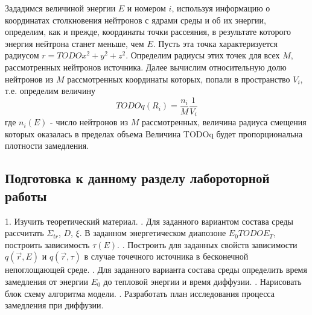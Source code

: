\documentclass[a4paper]{article}
\begin{document}
    Зададимся величиной энергии $E$ и номером $i$, используя
    информацию о координатах столкновения нейтронов с ядрами среды
    и об их энергии, определим, как и прежде, координаты точки
    рассеяния, в результате которого энергия нейтрона станет меньше,
    чем $E$. Пусть эта точка характеризуется радиусом
    \(r=TODO{x^2+y^2+z^2}\). Определим радиусы этих точек для всех
    $M$, рассмотренных нейтронов источника. Далее вычислим
    относительную долю нейтронов из $M$ рассмотренных координаты
    которых, попали в пространство $V_i$, т.е. определим величину
    \begin{equation}\nonumber
        TODO{q}(R_i)=\frac{n_i}{M}\frac{1}{V_i}
    \end{equation}
    где $n_i(E)$ - число нейтронов из $M$ рассмотренных, величина
    радиуса смещения которых оказалась в пределах объема
    Величина TODO{q} будет пропорциональна плотности замедления.
    \subsection{Подготовка к данному разделу лабороторной работы}
    1. Изучить теоретический материал.
    . Для заданного вариантом состава среды рассчитать $\Sigma_{tr}$,
    $D$, $\xi$. В заданном энергетическом диапозоне $E_0 TODO E_T$,
    построить зависимость $\tau(E)$.
    . Построить для заданных свойств зависимости $q(\vec{r},E)$ и
    $q(\vec{r},\tau)$ в случае точечного источника в бесконечной
    непоглощающей среде.
    . Для заданного варианта состава среды определить время
    замедления от энергии $E_0$ до тепловой энергии и время диффузии.
    . Нарисовать блок схему алгоритма модели.
    . Разработать план исследования процесса замедления при диффузии.
\end{document}
